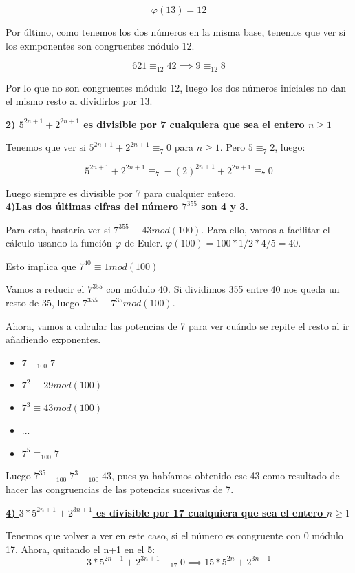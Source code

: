 \documentclass[11pt, a4paper, titlepage]{article}
\begin{document}
\[
\varphi(13) = 12
\]

Por último, como tenemos los dos números en la misma base, tenemos que ver si los exmponentes son congruentes módulo 12.

\[
621 \equiv_{12} 42 \implies 9 \equiv_{12} 8
\]

Por lo que no son congruentes módulo 12, luego los dos números iniciales no dan el mismo resto al dividirlos por 13.

\textbf{\underline{2) $5^{2n+1} + 2^{2n+1}$ es divisible por 7 cualquiera que sea el entero $n \geq 1$}}

Tenemos que ver si $5^{2n+1} + 2^{2n+1} \equiv_7 0$ para $n\geq 1$. Pero $5\equiv_7 2$, luego:

\[
5^{2n+1} + 2^{2n+1} \equiv_7 -(2)^{2n+1} + 2^{2n+1} \equiv_7 0
\]

Luego siempre es divisible por 7 para cualquier entero.\\


\underline{\textbf{4)Las dos últimas cifras del número $7^{355}$ son 4 y 3.}}

Para esto, bastaría ver si $7^{355} \equiv 43 mod(100)$. Para ello, vamos a facilitar el cálculo usando la función $\varphi$ de Euler. $\varphi(100) = 100*1/2 * 4/5 = 40$.

Esto implica que $ 7^{40} \equiv 1 mod(100)$

Vamos a reducir el $7^{355}$ con módulo 40. Si dividimos 355 entre 40 nos queda un resto de 35, luego $7^{355} \equiv 7^{35} mod(100)$.

Ahora, vamos a calcular las potencias de 7 para ver cuándo se repite el resto al ir añadiendo exponentes.
\begin{itemize}
	\item $7 \equiv_{100} 7$
	\item $7^2 \equiv 29 mod(100)$
	\item $7^3 \equiv 43 mod(100)$
	\item ...
	\item $7^5 \equiv_{100} 7$
\end{itemize}

Luego $7^{35} \equiv_{100} 7^3 \equiv_{100} 43$, pues ya habíamos obtenido ese 43 como resultado de hacer las congruencias de las potencias sucesivas de 7.


\underline{\textbf{4) $3*5^{2n+1} + 2^{3n+1}$ es divisible por 17 cualquiera que sea el entero $n\geq 1$}}

Tenemos que volver a ver en este caso, si el número es congruente con 0 módulo 17.
Ahora, quitando el n+1 en el 5:
\[
3*5^{2n+1} + 2^{3n+1} \equiv_{17} 0  \implies 15*5^{2n} + 2^{3n+1}
\]
\end{document}
